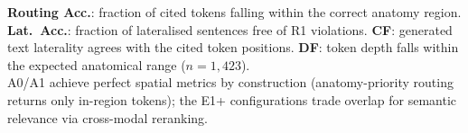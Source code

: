 \begin{table}[t]
\vspace{4pt}
{\footnotesize\raggedright
\textbf{Routing Acc.}: fraction of cited tokens falling within the correct anatomy region.
\textbf{Lat.\ Acc.}: fraction of lateralised sentences free of R1 violations.
\textbf{CF}: generated text laterality agrees with the cited token positions.
\textbf{DF}: token depth falls within the expected anatomical range ($n{=}1{,}423$).\\
A0/A1 achieve perfect spatial metrics by construction (anatomy-priority routing returns only in-region tokens);
the E1+ configurations trade overlap for semantic relevance via cross-modal reranking.\par
}
\end{table}
